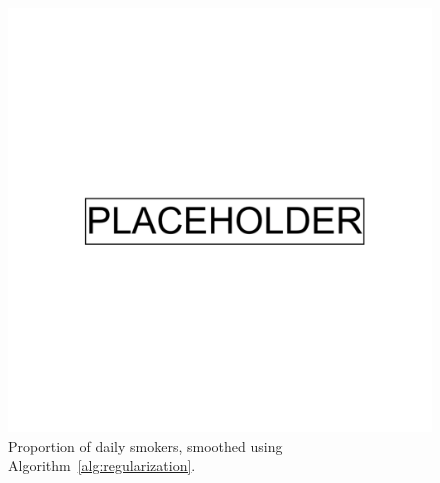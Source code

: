 \clearpage

\begin{figure}[ht]
  \centering
    \includegraphics[width=0.9\linewidth]{placeholder.png}
    \caption[Proportion of daily smokers]{Proportion of daily smokers, smoothed using Algorithm~\ref{alg:regularization}.}
    \label{fig:supp_ukb_smoking}
\end{figure}

\clearpage

